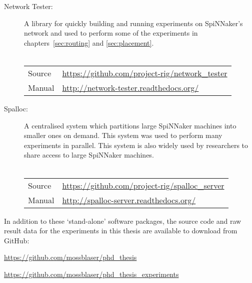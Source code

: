 \begin{description}
		\item [Network Tester:] A library for quickly building and running
		experiments on SpiNNaker's network and used to perform some of the
		experiments in chapters~\ref{sec:routing} and \ref{sec:placement}.
		\\
		\vspace*{-1.25em}
		\\
		\begin{tabular}{ll}
			Source & \url{https://github.com/project-rig/network_tester} \\
			Manual & \url{http://network-tester.readthedocs.org/} \\
		\end{tabular}
		
		\item [Spalloc:] A centralised system which partitions large SpiNNaker
		machines into smaller ones on demand. This system was used to perform many
		experiments in parallel. This system is also widely used by researchers to
		share access to large SpiNNaker machines.
		\\
		\vspace*{-1.25em}
		\\
		\begin{tabular}{ll}
			Source & \url{https://github.com/project-rig/spalloc_server} \\
			Manual & \url{http://spalloc-server.readthedocs.org/} \\
		\end{tabular}
		
	\end{description}

In addition to these `stand-alone' software packages, the source code and raw
result data for the experiments in this thesis are available to download from
GitHub:

\url{https://github.com/mossblaser/phd_thesis}

\url{https://github.com/mossblaser/phd_thesis_experiments}
